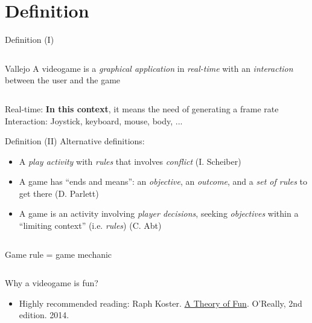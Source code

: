 \documentclass[10pt,compress]{beamer} %
\begin{document}
\section[Definition]{Definition}
\begin{frame}{Definition (I)}
    \begin{columns}
	   \begin{block}{Vallejo}
	   A videogame is a \textit{graphical application} in \textit{real-time} with an \textit{interaction} between the user and the game
	   \end{block}
	\end{columns}
	\bigskip
	Real-time: \textbf{In this context}, it means the need of generating a frame rate\\
	Interaction: Joystick, keyboard, mouse, body, ...
\end{frame}

\begin{frame}{Definition (II)}
	Alternative definitions:

  	\begin{itemize}
	\item A \textit{play activity} with \textit{rules} that involves \textit{conflict} (I. Scheiber)
	\item A game has ``ends and means'': an \textit{objective}, an \textit{outcome}, and a \textit{set of rules} to get there (D. Parlett)
	\item A game is an activity involving \textit{player decisions}, seeking \textit{objectives} within a ``limiting context'' (i.e. \textit{rules}) (C. Abt)
	\end{itemize}

    \begin{columns}
            \begin{block}{}
            Game rule = \alert{game mechanic}
            \end{block}
	\end{columns}

    \bigskip

    Why a videogame is fun?
    \begin{itemize}
	    \item Highly recommended reading: Raph Koster. \href{http://www.theoryoffun.com/theoryoffun.pdf}{A Theory of Fun}. O'Really, 2nd edition. 2014.
	\end{itemize}

\end{frame}
\end{document}
